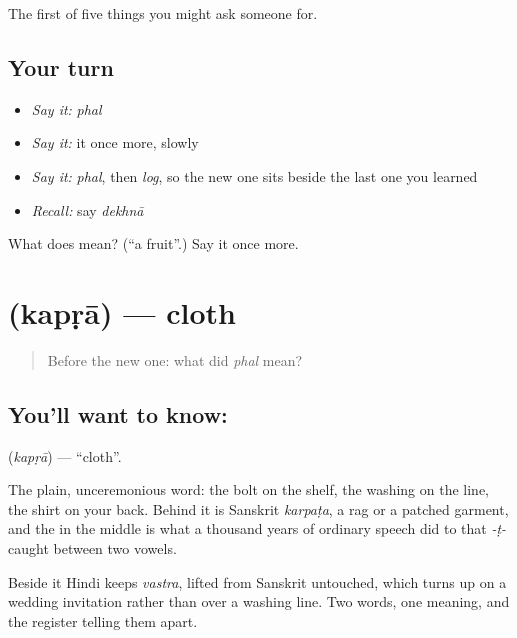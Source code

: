 \begin{grammarlens}[title={What you've built}]
The first of five things you might ask someone for.
\end{grammarlens}

\subsection*{Your turn}
\begin{itemize}
\raggedright
  \item \emph{Say it:} \emph{phal}
  \item \emph{Say it:} it once more, slowly
  \item \emph{Say it:} \emph{phal}, then \emph{log}, so the new one sits beside the last one you learned
  \item \emph{Recall:} say \emph{dekhnā}
\end{itemize}

\begin{tcolorbox}[breakable,colback=teal!4,colframe=teal!35!black,title={Before you move on}]
What does  mean? (\textquotedblleft{}a fruit\textquotedblright{}.) Say it once more.
\end{tcolorbox}
\section[\texorpdfstring{\hi{कपड़ा} (kapṛā)}{कपड़ा (kapṛā)}]{ (kapṛā) — cloth}

\label{lesson:HI-C45-cloth}



\begin{quote}
Before the new one: what did \emph{phal} mean?
\end{quote}

\subsection*{You'll want to know: }
\textbf{} (\emph{kapṛā}) — \textquotedblleft{}cloth\textquotedblright{}.

The plain, unceremonious word: the bolt on the shelf, the washing on the line, the shirt on your back. Behind it is Sanskrit \emph{karpaṭa}, a rag or a patched garment, and the  in the middle is what a thousand years of ordinary speech did to that \emph{-ṭ-} caught between two vowels.

Beside it Hindi keeps \emph{vastra}, lifted from Sanskrit untouched, which turns up on a wedding invitation rather than over a washing line. Two words, one meaning, and the register telling them apart.

